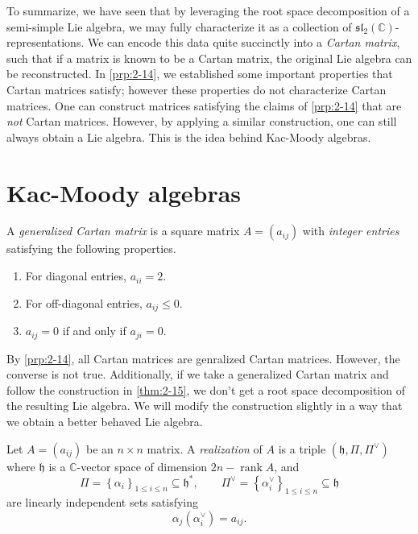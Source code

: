 \documentclass[11pt, letterpaper]{article}
\theoremstyle{plain}
\begin{document}
To summarize, we have seen that by leveraging the root space decomposition of a semi-simple Lie algebra, we may fully characterize it as a collection of $\mathfrak{sl} _2(\mathbb{C} )$-representations. We can encode this data quite succinctly into a \emph{Cartan matrix}, such that if a matrix is known to be a Cartan matrix, the original Lie algebra can be reconstructed. In \cref{prp:2-14}, we established some important properties that Cartan matrices satisfy; however these properties do not characterize Cartan matrices. One can construct matrices satisfying the claims of \cref{prp:2-14} that are \emph{not} Cartan matrices. However, by applying a similar construction, one can still always obtain a Lie algebra. This is the idea behind Kac-Moody algebras.

\section{Kac-Moody algebras}

\begin{definition}\label{dfn:3-1}
	A \emph{generalized Cartan matrix} is a square matrix $A=(a_{ij} )$ with \emph{integer entries} satisfying the following properties.
	\begin{enumerate}[label=(\arabic*), align=right]
		\item For diagonal entries, $a_{ii} =2$.
		\item For off-diagonal entries, $a_{ij} \leq 0$.
		\item $a_{ij} =0$ if and only if $a_{ji} =0$.
	\end{enumerate}
\end{definition}

By \cref{prp:2-14}, all Cartan matrices are genralized Cartan matrices. However, the converse is not true. Additionally, if we take a generalized Cartan matrix and follow the construction in \cref{thm:2-15}, we don't get a root space decomposition of the resulting Lie algebra. We will modify the construction slightly in a way that we obtain a better behaved Lie algebra.

\begin{definition}\label{dfn:3-2}
	Let $A=(a_{ij} )$ be an $n\times n$ matrix. A \emph{realization} of $A$ is a triple $(\mathfrak{h} ,\Pi ,\Pi ^\vee )$ where $\mathfrak{h} $ is a $\mathbb{C} $-vector space of dimension $2n-\operatorname{rank } A$, and
	\[
		\Pi =\left\{ \alpha _i \right\}_{1\leq i\leq n} \subseteq \mathfrak{h} ^*,\qquad \Pi ^\vee =\left\{ \alpha ^\vee _i \right\}_{1\leq i\leq n} \subseteq \mathfrak{h} 
	\]
	are linearly independent sets satisfying
	\[
		\alpha _j(\alpha ^\vee _i)=a_{ij} .
	\]
\end{definition}
\end{document}

